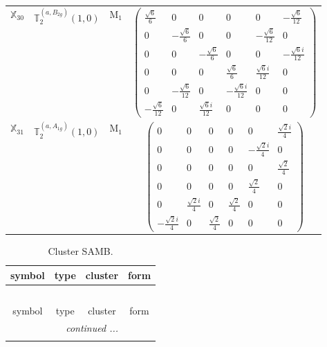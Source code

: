 \documentclass[fleqn,10pt,landscape]{article}
\begin{document}
\begin{itemize}
\begin{center}
\begin{longtable}{c|c|c|c}
$ \mathbb{X}_{30} $ & $\mathbb{T}_{2}^{(a,B_{2g})}(1,0)$ & M$_{1}$ & $\begin{pmatrix} \frac{\sqrt{6}}{6} & 0 & 0 & 0 & 0 & - \frac{\sqrt{6}}{12} \\ 0 & - \frac{\sqrt{6}}{6} & 0 & 0 & - \frac{\sqrt{6}}{12} & 0 \\ 0 & 0 & - \frac{\sqrt{6}}{6} & 0 & 0 & - \frac{\sqrt{6} i}{12} \\ 0 & 0 & 0 & \frac{\sqrt{6}}{6} & \frac{\sqrt{6} i}{12} & 0 \\ 0 & - \frac{\sqrt{6}}{12} & 0 & - \frac{\sqrt{6} i}{12} & 0 & 0 \\ - \frac{\sqrt{6}}{12} & 0 & \frac{\sqrt{6} i}{12} & 0 & 0 & 0 \end{pmatrix}$ \\
$ \mathbb{X}_{31} $ & $\mathbb{T}_{2}^{(a,A_{1g})}(1,0)$ & M$_{1}$ & $\begin{pmatrix} 0 & 0 & 0 & 0 & 0 & \frac{\sqrt{2} i}{4} \\ 0 & 0 & 0 & 0 & - \frac{\sqrt{2} i}{4} & 0 \\ 0 & 0 & 0 & 0 & 0 & \frac{\sqrt{2}}{4} \\ 0 & 0 & 0 & 0 & \frac{\sqrt{2}}{4} & 0 \\ 0 & \frac{\sqrt{2} i}{4} & 0 & \frac{\sqrt{2}}{4} & 0 & 0 \\ - \frac{\sqrt{2} i}{4} & 0 & \frac{\sqrt{2}}{4} & 0 & 0 & 0 \end{pmatrix}$ \\
\end{longtable}
\end{center}
\begin{center}
\renewcommand{\arraystretch}{1.3}
\begin{longtable}{c|c|c|c}
\caption{Cluster SAMB.}
 \\
 \hline \hline
symbol & type & cluster & form \\ \hline \endfirsthead

\multicolumn{3}{l}{\tablename\ \thetable{}} \\
 \hline \hline
symbol & type & cluster & form \\ \hline \endhead

 \hline \hline
\multicolumn{3}{r}{\footnotesize\it continued ...} \\ \endfoot


\end{longtable}
\end{center}
\end{itemize}
\end{document}
